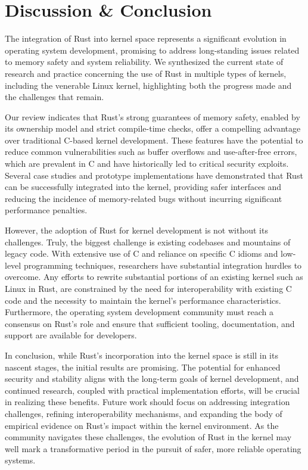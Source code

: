 \documentclass[sigconf]{acmart}
\begin{document}
\section{Discussion \& Conclusion}

The integration of Rust into  kernel space represents a significant evolution in operating system
development, promising to address long-standing issues related to memory safety and system
reliability. We synthesized the current state of research and
practice concerning the use of Rust in multiple types of kernels, including the venerable Linux
kernel, highlighting both the progress made and the challenges that remain.

Our review indicates that Rust's strong guarantees of memory safety, enabled by its ownership model
and strict compile-time checks, offer a compelling advantage over traditional C-based kernel
development. These features have the potential to reduce common vulnerabilities such as buffer
overflows and use-after-free errors, which are prevalent in C and have historically led to critical
security exploits. Several case studies and prototype implementations have demonstrated that Rust
can be successfully integrated into the kernel, providing safer interfaces and reducing the
incidence of memory-related bugs without incurring significant performance penalties.

However, the adoption of Rust for kernel development is not without its challenges. Truly, the
biggest challenge is existing codebases and mountains of legacy code. With extensive use of C and
reliance on specific C idioms and low-level programming techniques, researchers have substantial
integration hurdles to overcome. Any efforts to rewrite substantial portions of an existing kernel
such as Linux in Rust, are constrained by the need for interoperability with existing C code and the
necessity to maintain the kernel's performance characteristics. Furthermore, the operating system
development community must reach a consensus on Rust's role and ensure that sufficient tooling,
documentation, and support are available for developers.

In conclusion, while Rust's incorporation into the kernel space is still in its nascent stages, the
initial results are promising. The potential for enhanced security and stability aligns with the
long-term goals of kernel development, and continued research, coupled with practical implementation
efforts, will be crucial in realizing these benefits. Future work should focus on addressing
integration challenges, refining interoperability mechanisms, and expanding the body of empirical
evidence on Rust's impact within the kernel environment. As the community navigates these
challenges, the evolution of Rust in the kernel may well mark a transformative period in the pursuit
of safer, more reliable operating systems.



\end{document}

